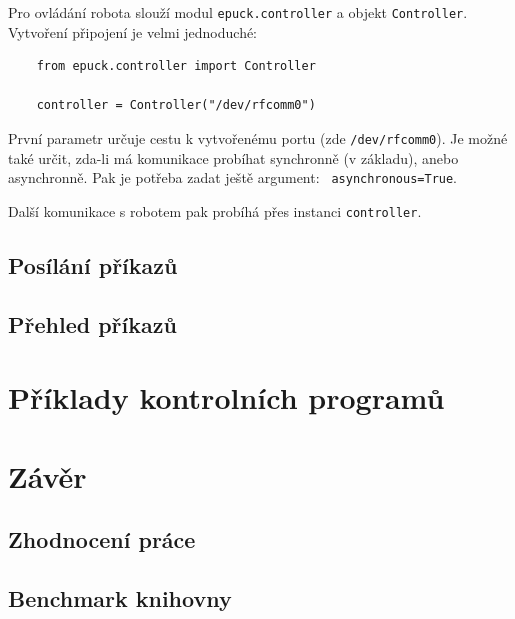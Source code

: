 \documentclass[12pt,notitlepage]{report}
\begin{document}
    Pro ovládání robota slouží modul {\tt epuck.controller} a objekt {\tt Controller}. Vytvoření připojení je velmi jednoduché:
    \begin{verbatim}
    from epuck.controller import Controller

    controller = Controller("/dev/rfcomm0")
    \end{verbatim}
    První parametr určuje cestu k vytvořenému portu (zde {\tt /dev/rfcomm0}).
    Je možné také určit, zda-li má komunikace probíhat synchronně (v základu),
    anebo asynchronně. Pak je potřeba zadat ještě argument: {\tt
    asynchronous=True}.

    Další komunikace s robotem pak probíhá přes instanci {\tt controller}.

    \section{Posílání příkazů}

    \section{Přehled příkazů}

\chapter{Příklady kontrolních programů}

\chapter{Závěr}

    \section{Zhodnocení práce}

    \section{Benchmark knihovny}





\end{document}
